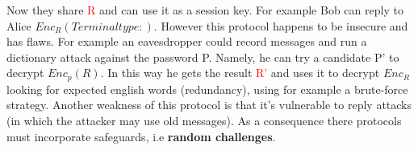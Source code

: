 \documentclass{article}
\begin{document}
\newline 
Now they share \textcolor{red}{R} and can use it as a session key. For example Bob can reply to Alice $Enc_R(Terminal type:)$.
\newline However this protocol happens to be insecure and has flaws. For example an eavesdropper could record messages and run a dictionary attack against the password P. Namely, he can try a candidate P' to decrypt $Enc_p(R)$. In this way he gets the result \textcolor{red}{R'} and uses it to decrypt $Enc_R$ looking for expected english words (redundancy), using for example a brute-force strategy.
\newline Another weakness of this protocol is that it's vulnerable to reply attacks (in which the attacker may use old messages). As a consequence there protocols must incorporate safeguards, i.e \textbf{random challenges}.
\end{document}
